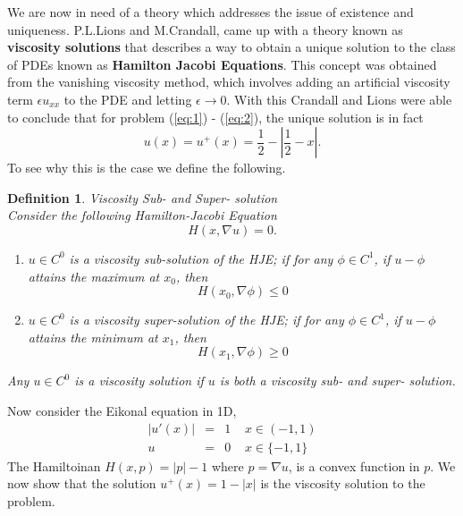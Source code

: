 \documentclass[11pt]{article}
\newtheorem{definition}{Definition}
\begin{document}
	\noindent
	We are now in need of a theory which addresses the issue of existence and uniqueness. P.L.Lions and M.Crandall, came up with a theory known as \textbf{viscosity solutions} \cite{lions} that describes a way to obtain a unique solution to the class of PDEs known as \textbf{Hamilton Jacobi Equations}. This concept was obtained from the vanishing viscosity method, which involves adding an artificial viscosity term $\epsilon u_{xx}$ to the PDE and letting $\epsilon \to 0$. With this Crandall and Lions were able to conclude that for problem (\ref{eq:1}) - (\ref{eq:2}), the unique solution is in fact
	\begin{equation}
		u(x) = u^+(x) = \frac{1}{2}- \left|\frac{1}{2} - x\right| .
	\end{equation}
	To see why this is the case we define the following.
	\begin{definition}Viscosity Sub- and Super- solution\\
		
		Consider the following Hamilton-Jacobi Equation
		\begin{equation}
			H(x, \nabla u) = 0.
		\end{equation}
		\begin{enumerate}
			\item
			$u \in C^0$ is a viscosity sub-solution of the HJE; if for any $\phi \in C^1$, if $u-\phi$ attains the maximum at $x_0$, then
			\begin{equation}
			H(x_0,\nabla \phi) \le 0
			\end{equation}
			
			\item
			$u \in C^0$ is a viscosity super-solution of the HJE; if for any $\phi \in C^1$, if $u-\phi$ attains the minimum at $x_1$, then
			\begin{equation}
			H(x_1,\nabla \phi) \ge 0
			\end{equation}
		\end{enumerate}
		
		Any $u \in C^0$ is a viscosity solution if $u$ is both a viscosity sub- and super- solution.
	\end{definition}
	
	\noindent
	Now consider the Eikonal equation in 1D,
	\begin{eqnarray}
		|u'(x)| &=& 1 \;\;\;\; x \in (-1,1)\\
		u &=& 0 \;\;\;\; x \in \{-1,1\}
	\end{eqnarray}
	The Hamiltoinan $H(x,p) = |p|-1$ where $p = \nabla u$, is a convex function in $p$. We now show that the solution $u^+(x) = 1-|x|$ is the viscosity solution to the problem.\\
	
\end{document}
